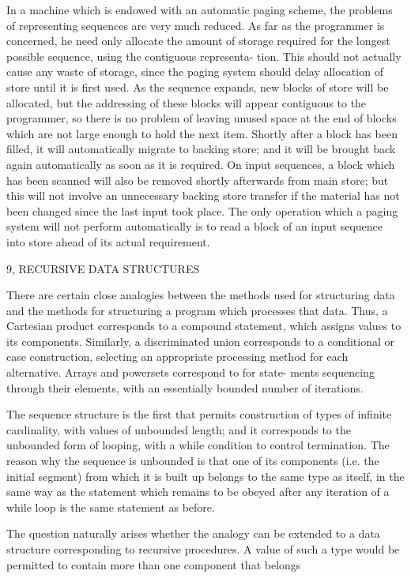 {{{{				In a machine which is endowed with an automatic paging scheme, the problems of representing sequences are very much reduced. As far as the programmer is concerned, he need only allocate the amount of storage required for the longest possible sequence, using the contiguous representa- tion. This should not actually cause any waste of storage, since the paging system should delay allocation of store until it is first used. As the sequence expands, new blocks of store will be allocated, but the addressing of these blocks will appear contiguous to the programmer, so there is no problem of leaving unused space at the end of blocks which are not large enough to hold the next item. Shortly after a block has been filled, it will automatically migrate to backing store; and it will be brought back again automatically as soon as it is required. On input sequences, a block which has been scanned will also be removed shortly afterwards from main store; but this will not involve an unnecessary backing store transfer if the material has not been changed since the last input took place. The only operation which a paging system will not perform automatically is to read a block of an input sequence into store ahead of its actual requirement.
				
				9, RECURSIVE DATA STRUCTURES
				
				There are certain close analogies between the methods used for structuring data and the methods for structuring a program which processes that data. Thus, a Cartesian product corresponds to a compound statement, which assigns values to its components. Similarly, a discriminated union corresponds to a conditional or case construction, selecting an appropriate processing method for each alternative. Arrays and powersets correspond to for state- ments sequencing through their elements, with an essentially bounded number of iterations.
				
				The sequence structure is the first that permits construction of types of infinite cardinality, with values of unbounded length; and it corresponds to the unbounded form of looping, with a while condition to control termination. The reason why the sequence is unbounded is that one of its components (i.e. the initial segment) from which it is built up belongs to the same type as itself, in the same way as the statement which remains to be obeyed after any iteration of a while loop is the same statement as before.
				
				The question naturally arises whether the analogy can be extended to a data structure corresponding to recursive procedures. A value of such a type would be permitted to contain more than one component that belongs
				
}}}}
